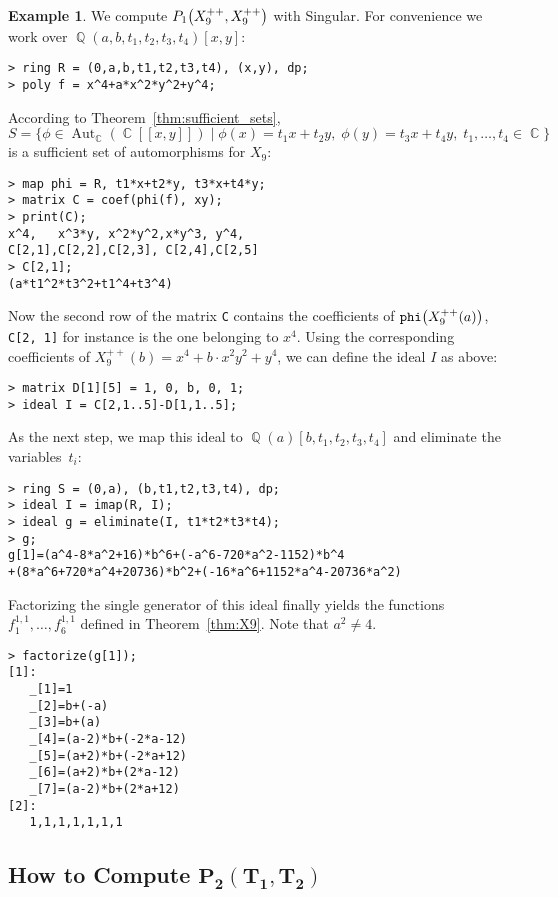 \documentclass[noend]{amsproc}
\theoremstyle{definition}
\newtheorem{example}[theorem]{Example}
\let\originalleft\left
\let\originalright\right
\renewcommand{\left}{\mathopen{}\mathclose\bgroup\originalleft}
\renewcommand{\right}{\aftergroup\egroup\originalright}
\DeclareMathOperator{\Q}{\mathbb{Q}}
\DeclareMathOperator{\C}{\mathbb{C}}
\DeclareMathOperator{\Aut}{Aut}
\begin{document}
\begin{example}\label{ex:P1}
We compute $P_1\left(X_9^{++}, X_9^{++}\right)$ with Singular. For convenience
we work over $\Q(a,b,t_1,t_2,t_3,t_4)[x,y]$:
\begin{verbatim}
> ring R = (0,a,b,t1,t2,t3,t4), (x,y), dp;
> poly f = x^4+a*x^2*y^2+y^4;
\end{verbatim}
According to Theorem~\ref{thm:sufficient_sets},
\[
S = \bigl\{ \phi \in \Aut_{\C}(\C[[x,y]])
\mid \phi(x) = t_1 x + t_2 y,\; \phi(y) = t_3 x + t_4 y,\;
t_1, \ldots, t_4 \in \C \bigr\}
\]
is a sufficient set of automorphisms for $X_9$:
\begin{verbatim}
> map phi = R, t1*x+t2*y, t3*x+t4*y;
> matrix C = coef(phi(f), xy);
> print(C);
x^4,   x^3*y, x^2*y^2,x*y^3, y^4,  
C[2,1],C[2,2],C[2,3], C[2,4],C[2,5]
> C[2,1];
(a*t1^2*t3^2+t1^4+t3^4)
\end{verbatim}
Now the second row of the matrix \verb+C+ contains the coefficients of
$\verb+phi+\left(X_9^{++}(a)\right)$, \verb+C[2, 1]+ for instance is the one
belonging to $x^4$. Using the corresponding coefficients of
$X_9^{++}(b) = x^4 + b \cdot x^2 y^2 + y^4$, we can define the ideal $I$ as
above:
\begin{verbatim}
> matrix D[1][5] = 1, 0, b, 0, 1;
> ideal I = C[2,1..5]-D[1,1..5];
\end{verbatim}
As the next step, we map this ideal to $\Q(a)[b,t_1,t_2,t_3,t_4]$ and eliminate
the variables~$t_i$:
\begin{verbatim}
> ring S = (0,a), (b,t1,t2,t3,t4), dp;
> ideal I = imap(R, I);
> ideal g = eliminate(I, t1*t2*t3*t4);
> g;
g[1]=(a^4-8*a^2+16)*b^6+(-a^6-720*a^2-1152)*b^4
+(8*a^6+720*a^4+20736)*b^2+(-16*a^6+1152*a^4-20736*a^2)
\end{verbatim}
Factorizing the single generator of this ideal finally yields the functions
$f_1^{1,1}, \ldots, f_6^{1,1}$ defined in Theorem~\ref{thm:X9}. Note that
$a^2 \neq 4$.
\begin{verbatim}
> factorize(g[1]);
[1]:
   _[1]=1
   _[2]=b+(-a)
   _[3]=b+(a)
   _[4]=(a-2)*b+(-2*a-12)
   _[5]=(a+2)*b+(-2*a+12)
   _[6]=(a+2)*b+(2*a-12)
   _[7]=(a-2)*b+(2*a+12)
[2]:
   1,1,1,1,1,1,1
\end{verbatim}
\end{example}


\subsection{How to Compute $\boldsymbol{P_2(T_1, T_2)}$}%
\label{ssec:computing_P2}
\end{document}

